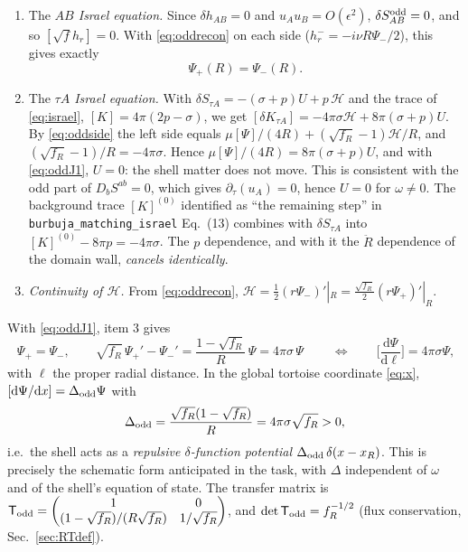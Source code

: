 \documentclass[11pt,a4paper]{article}
\numberwithin{equation}{section}
\newcommand{\sq}{\sqrt{f_R}}
\newcommand{\dd}{\mathrm{d}}
\begin{document}
\begin{enumerate}
\item The \emph{$AB$ Israel equation.} Since $\delta h_{AB}=0$ and $u_Au_B=O(\epsilon^2)$,
  $\delta S_{AB}^{\rm odd}=0$, and so $[\sqrt f h_r]=0$. With \eqref{eq:oddrecon} on each side
  ($h_r^-=-i\nu R\Psi_-/2$), this gives exactly
  \begin{equation}\Psi_+(R)=\Psi_-(R).\label{eq:oddJ1}\end{equation}
\item The \emph{$\tau A$ Israel equation.} With $\delta S_{\tau A}=-(\sigma+p)U+p\,\mathcal H$ and the trace of
  \eqref{eq:israel}, $[K]=4\pi(2p-\sigma)$, we get
  $[\delta K_{\tau A}]=-4\pi\sigma\mathcal H+8\pi(\sigma+p)U$. By \eqref{eq:oddside} the left side equals
  $\mu[\Psi]/(4R)+(\sq-1)\mathcal H/R$, and $(\sq-1)/R=-4\pi\sigma$. Hence
  $\mu[\Psi]/(4R)=8\pi(\sigma+p)U$, and with \eqref{eq:oddJ1}, $U=0$: the shell matter does not move.
  This is consistent with the odd part of $D_bS^{ab}=0$, which gives $\partial_\tau(u_A)=0$, hence $U=0$ for
  $\omega\neq0$. The background trace $[K]^{(0)}$ identified as ``the remaining step'' in
  \texttt{burbuja\_matching\_israel} Eq.~(13) combines with $\delta S_{\tau A}$ into
  $[K]^{(0)}-8\pi p=-4\pi\sigma$. The $p$ dependence, and with it the $\ddot R$ dependence of the domain wall,
  \emph{cancels identically}.
\item \emph{Continuity of $\mathcal H$.} From \eqref{eq:oddrecon},
  $\mathcal H=\tfrac12(r\Psi_-)'|_R=\tfrac{\sq}{2}(r\Psi_+)'|_R$.
\end{enumerate}
With \eqref{eq:oddJ1}, item 3 gives
\begin{equation}
\boxed{\ \Psi_+=\Psi_-,\qquad \sq\,\Psi_+'-\Psi_-'=\frac{1-\sq}{R}\,\Psi=4\pi\sigma\,\Psi\ }
\qquad\Longleftrightarrow\qquad
\Big[\frac{\dd\Psi}{\dd\ell}\Big]=4\pi\sigma\Psi,
\label{eq:oddfinal}
\end{equation}
with $\ell$ the proper radial distance. In the global tortoise coordinate \eqref{eq:x},
$[\dd\Psi/\dd x]=\Delta_{\rm odd}\Psi$ with
\begin{equation}
\Delta_{\rm odd}=\frac{\sq(1-\sq)}{R}=4\pi\sigma\sq>0 ,
\label{eq:Deltaodd}
\end{equation}
i.e.\ the shell acts as a \emph{repulsive $\delta$-function potential} $\Delta_{\rm odd}\,\delta(x-x_R)$. This is
precisely the schematic form anticipated in the task, with $\Delta$ independent of $\omega$ and of the shell's
equation of state. The transfer matrix is
$\mathsf T_{\rm odd}=\begin{pmatrix}1&0\\ (1-\sq)/(R\sq) & 1/\sq\end{pmatrix}$, and $\det\mathsf T_{\rm odd}=f_R^{-1/2}$
(flux conservation, Sec.~\ref{sec:RTdef}).
\end{document}
